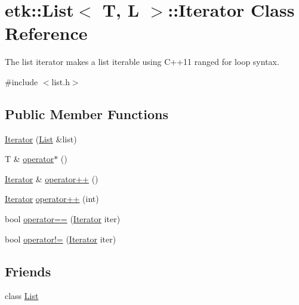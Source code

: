 \hypertarget{classetk_1_1_list_1_1_iterator}{\section{etk\-:\-:List$<$ T, L $>$\-:\-:Iterator Class Reference}
\label{classetk_1_1_list_1_1_iterator}
}


The list iterator makes a list iterable using C++11 ranged for loop syntax.  




{\ttfamily \#include $<$list.\-h$>$}

\subsection*{Public Member Functions}
\begin{DoxyCompactItemize}
\item 
\hyperlink{classetk_1_1_list_1_1_iterator_a6a299eafca46db90564fdbffca60c7fa}{Iterator} (\hyperlink{classetk_1_1_list}{List} \&list)
\item 
T \& \hyperlink{classetk_1_1_list_1_1_iterator_a368d2b78fd175b0dac43aee52dc54f8f}{operator$\ast$} ()
\item 
\hyperlink{classetk_1_1_list_1_1_iterator}{Iterator} \& \hyperlink{classetk_1_1_list_1_1_iterator_aa7b714a588a29db93f9e406223b8783c}{operator++} ()
\item 
\hyperlink{classetk_1_1_list_1_1_iterator}{Iterator} \hyperlink{classetk_1_1_list_1_1_iterator_ae1f9efc5598a14487881bd7281fd27dd}{operator++} (int)
\item 
bool \hyperlink{classetk_1_1_list_1_1_iterator_a971c5acbef70bdd9a9513a87ad40fd4e}{operator==} (\hyperlink{classetk_1_1_list_1_1_iterator}{Iterator} iter)
\item 
bool \hyperlink{classetk_1_1_list_1_1_iterator_a7c9b29d64794609438e68b928125f14b}{operator!=} (\hyperlink{classetk_1_1_list_1_1_iterator}{Iterator} iter)
\end{DoxyCompactItemize}
\subsection*{Friends}
\begin{DoxyCompactItemize}
\item 
class \hyperlink{classetk_1_1_list_1_1_iterator_a8cee552d09eaeb60a09d95309a87b498}{List}
\end{DoxyCompactItemize}


